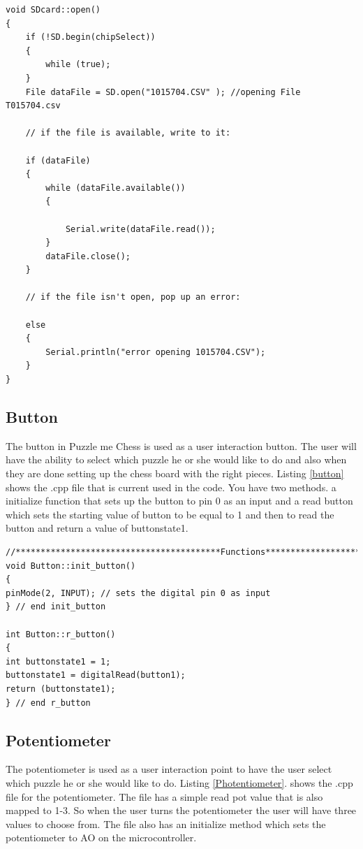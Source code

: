 \documentclass[11pt]{article}
\begin{document}
\begin{lstlisting}[caption={Puzzle me Chess - SDcard.cpp file},label={sdcard1}]
void SDcard::open()
{
    if (!SD.begin(chipSelect))
    {
        while (true);
    }
    File dataFile = SD.open("1015704.CSV" ); //opening File T015704.csv

    // if the file is available, write to it:

    if (dataFile)
    {
        while (dataFile.available())
        {

            Serial.write(dataFile.read());
        }
        dataFile.close();
    }

    // if the file isn't open, pop up an error:

    else
    {
        Serial.println("error opening 1015704.CSV");
    }
}
\end{lstlisting}

\subsection{Button}
The button in Puzzle me Chess is used as a user interaction button. The user will have the ability to select which puzzle he or she would like to do and also when they are done setting up the chess board with the right pieces. Listing \ref{button} shows the .cpp file that is current used in the code. You have two methods. a initialize function that sets up the button to pin 0 as an input and a read button which sets the starting value of button to be equal to 1 and then to read the button and return a value of buttonstate1. 

\begin{lstlisting}[caption={Puzzle me Chess - button.cpp file},label={button}]
//*****************************************Functions**************************//
void Button::init_button()
{
pinMode(2, INPUT); // sets the digital pin 0 as input
} // end init_button

int Button::r_button()
{
int buttonstate1 = 1; 
buttonstate1 = digitalRead(button1);
return (buttonstate1);
} // end r_button
\end{lstlisting}

\subsection{Potentiometer}
The potentiometer is used as a user interaction point to have the user select which puzzle he or she would like to do. Listing \ref{Photentiometer}. shows the .cpp file for the potentiometer. The file has a simple read pot value that is also mapped to 1-3. So when the user turns the potentiometer the user will have three values to choose from. The file also has an initialize method which sets the potentiometer to AO on the microcontroller. 
\end{document}
